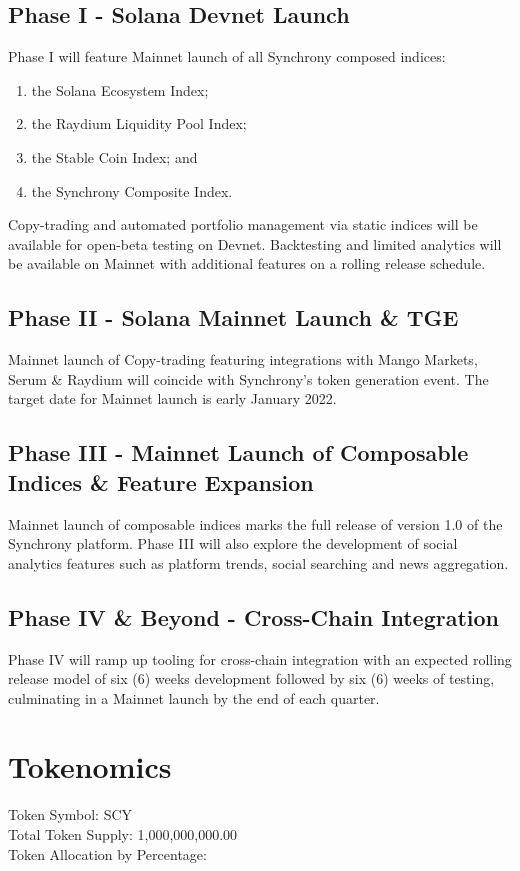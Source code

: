 \documentclass[10pt]{article}
\begin{document}
					\subsection{Phase I - Solana Devnet Launch}
					Phase I will feature Mainnet launch of all Synchrony composed indices:
					\begin{enumerate}
						\item the Solana Ecosystem Index;
						\item the Raydium Liquidity Pool Index;
						\item the Stable Coin Index; and
						\item the Synchrony Composite Index.
					\end{enumerate}
					Copy-trading and automated portfolio management via static indices will be
					available for open-beta testing on Devnet. Backtesting and limited analytics
					will be available on Mainnet with additional features on a rolling release
					schedule.

					\subsection{Phase II - Solana Mainnet Launch \& TGE}
					Mainnet launch of Copy-trading featuring integrations with Mango Markets, Serum
					\& Raydium will coincide with Synchrony's token generation event. The target
					date for Mainnet launch is early January 2022.

					\subsection{Phase III - Mainnet Launch of Composable Indices \& Feature Expansion}
					Mainnet launch of composable indices marks the full release of version 1.0 of
					the Synchrony platform. Phase III will also explore the development of social
					analytics features such as platform trends, social searching and news
					aggregation.

					\subsection{Phase IV \& Beyond - Cross-Chain Integration}
					Phase IV will ramp up tooling for cross-chain integration with an expected
					rolling release model of six (6) weeks development followed by six (6) weeks of
					testing, culminating in a Mainnet launch by the end of each quarter.

					\section{Tokenomics}
					Token Symbol: SCY\\
					Total Token Supply: 1,000,000,000.00\\
					Token Allocation by Percentage:
\end{document}
